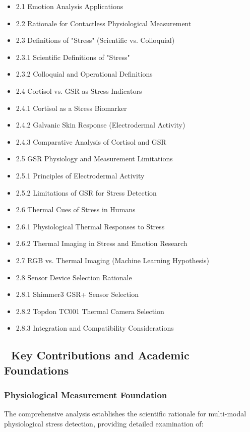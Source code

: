 \documentclass[12pt,a4paper]{article}
\begin{document}
\begin{itemize}
\item 2.1 Emotion Analysis Applications
\item 2.2 Rationale for Contactless Physiological Measurement
\item 2.3 Definitions of "Stress" (Scientific vs. Colloquial)
\item 2.3.1 Scientific Definitions of "Stress"
\item 2.3.2 Colloquial and Operational Definitions
\item 2.4 Cortisol vs. GSR as Stress Indicators
\item 2.4.1 Cortisol as a Stress Biomarker
\item 2.4.2 Galvanic Skin Response (Electrodermal Activity)
\item 2.4.3 Comparative Analysis of Cortisol and GSR
\item 2.5 GSR Physiology and Measurement Limitations
\item 2.5.1 Principles of Electrodermal Activity
\item 2.5.2 Limitations of GSR for Stress Detection
\item 2.6 Thermal Cues of Stress in Humans
\item 2.6.1 Physiological Thermal Responses to Stress
\item 2.6.2 Thermal Imaging in Stress and Emotion Research
\item 2.7 RGB vs. Thermal Imaging (Machine Learning Hypothesis)
\item 2.8 Sensor Device Selection Rationale
\item 2.8.1 Shimmer3 GSR+ Sensor Selection
\item 2.8.2 Topdon TC001 Thermal Camera Selection
\item 2.8.3 Integration and Compatibility Considerations

\end{itemize}
\subsection{🎯 Key Contributions and Academic Foundations}

\subsubsection{Physiological Measurement Foundation}

The comprehensive analysis establishes the scientific rationale for multi-modal physiological stress detection,
providing detailed examination of:
\end{document}

